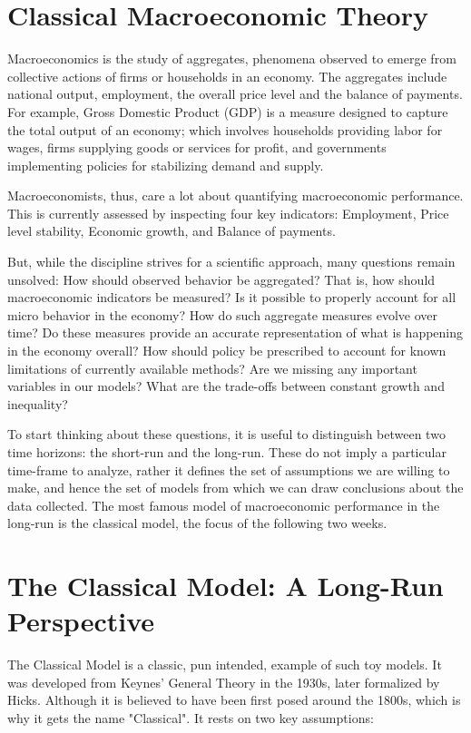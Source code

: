 \documentclass[10pt]{article}
\begin{document}
\section*{Classical Macroeconomic Theory}
Macroeconomics is the study of aggregates, phenomena observed to emerge from collective actions of firms or households in an economy. The aggregates include national output, employment, the overall price level and the balance of payments. For example, Gross Domestic Product (GDP) is a measure designed to capture the total output of an economy; which involves households providing labor for wages, firms supplying goods or services for profit, and governments implementing policies for stabilizing demand and supply.

Macroeconomists, thus, care a lot about quantifying macroeconomic performance. This is currently assessed by inspecting four key indicators: Employment, Price level stability, Economic growth, and Balance of payments.

But, while the discipline strives for a scientific approach, many questions remain unsolved: How should observed behavior be aggregated? That is, how should macroeconomic indicators be measured? Is it possible to properly account for all micro behavior in the economy? How do such aggregate measures evolve over time? Do these measures provide an accurate representation of what is happening in the economy overall? How should policy be prescribed to account for known limitations of currently available methods? Are we missing any important variables in our models? What are the trade-offs between constant growth and inequality?

To start thinking about these questions, it is useful to distinguish between two time horizons: the short-run and the long-run. These do not imply a particular time-frame to analyze, rather it defines the set of assumptions we are willing to make, and hence the set of models from which we can draw conclusions about the data collected. The most famous model of macroeconomic performance in the long-run is the classical model, the focus of the following two weeks.

\section*{The Classical Model: A Long-Run Perspective}
The Classical Model is a classic, pun intended, example of such toy models. It was developed from Keynes' General Theory in the 1930s, later formalized by Hicks. Although it is believed to have been first posed around the 1800s, which is why it gets the name "Classical". It rests on two key assumptions:
\end{document}

